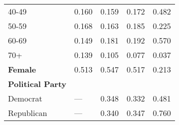 {\begin{tabular}{L{5.5cm} C{3.5cm} C{3.5cm} C{3.5cm} C{4cm}}
                          40-49                           &                          0.160                           &                          0.159                           &                          0.172                           &                          0.482                            \\
                          50-59                           &                          0.168                           &                          0.163                           &                          0.185                           &                          0.225                            \\
                          60-69                           &                          0.149                           &                          0.181                           &                          0.192                           &                          0.570                            \\
                           70+                            &                          0.139                           &                          0.105                           &                          0.077                           &                          0.037                            \\
\textbf{Female}                                           &                          0.513                           &                          0.547                           &                          0.517                           &                          0.213                            \\
\textbf{Political Party}                                  &                                                          &                                                          &                                                          &                                                           \\
                         Democrat                         &                           ---                            &                          0.348                           &                          0.332                           &                          0.481                            \\
                        Republican                        &                           ---                            &                          0.340                           &                          0.347                           &                          0.760                            \\

\end{tabular}}
